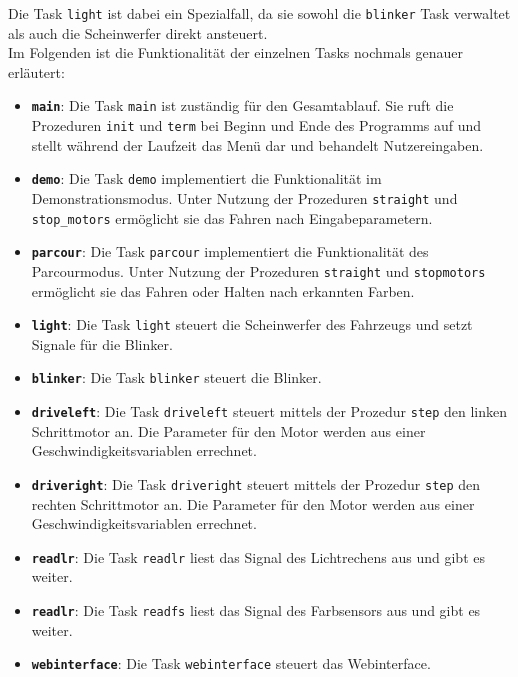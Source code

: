 Die Task \texttt{light} ist dabei ein Spezialfall, da sie sowohl die \texttt{blinker} Task verwaltet als auch die Scheinwerfer direkt ansteuert.\\

Im Folgenden ist die Funktionalität der einzelnen Tasks nochmals genauer erläutert:
\begin{itemize}
	\item \textbf{\texttt{main}}: Die Task \texttt{main} ist zuständig für den Gesamtablauf. Sie ruft die Prozeduren \texttt{init} und \texttt{term} bei Beginn und Ende des Programms auf und stellt während der Laufzeit das Menü dar und behandelt Nutzereingaben.
	
	\item \textbf{\texttt{demo}}: Die Task \texttt{demo} implementiert die Funktionalität im Demonstrationsmodus. Unter Nutzung der Prozeduren \texttt{straight} und \texttt{stop\_motors} ermöglicht sie das Fahren nach Eingabeparametern.
	
	\item \textbf{\texttt{parcour}}: Die Task \texttt{parcour} implementiert die Funktionalität des Parcourmodus. Unter Nutzung der Prozeduren \texttt{straight} und \texttt{stopmotors} ermöglicht sie das Fahren oder Halten nach erkannten Farben.
	
	\item \textbf{\texttt{light}}: Die Task \texttt{light} steuert die Scheinwerfer des Fahrzeugs und setzt Signale für die Blinker.
	
	\item \textbf{\texttt{blinker}}: Die Task \texttt{blinker} steuert die Blinker.
	
	\item \textbf{\texttt{driveleft}}: Die Task \texttt{driveleft} steuert mittels der Prozedur \texttt{step} den linken Schrittmotor an. Die Parameter für den Motor werden aus einer Geschwindigkeitsvariablen errechnet.
	
	\item \textbf{\texttt{driveright}}: Die Task \texttt{driveright} steuert mittels der Prozedur \texttt{step} den rechten Schrittmotor an. Die Parameter für den Motor werden aus einer Geschwindigkeitsvariablen errechnet.
	
	\item \textbf{\texttt{readlr}}: Die Task \texttt{readlr} liest das Signal des Lichtrechens aus und gibt es weiter.
	
	\item \textbf{\texttt{readlr}}: Die Task \texttt{readfs} liest das Signal des Farbsensors aus und gibt es weiter.
	
	\item \textbf{\texttt{webinterface}}: Die Task \texttt{webinterface} steuert das Webinterface.
\end{itemize}

